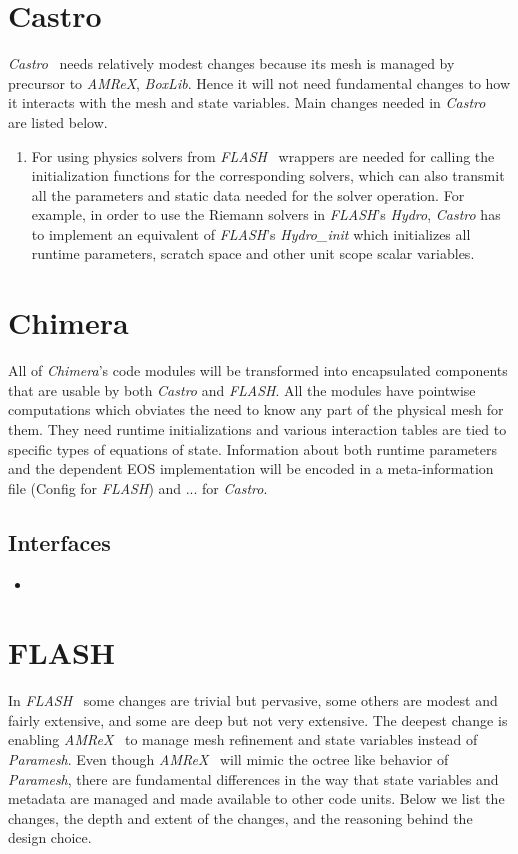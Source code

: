 \documentclass{article}
\newcommand{\flash}{{\it FLASH}}
\newcommand{\amrex}{{\it AMReX}}
\newcommand{\paramesh}{{\it Paramesh}}
\newcommand{\castro}{{\it Castro}\xspace}
\newcommand{\chimera}{{\it Chimera}\xspace}
\begin{document}
\section{Castro}
\label{sec:castro}
\castro~ needs relatively modest changes because its mesh is managed by
precursor to \amrex, {\it BoxLib}. Hence it will not need fundamental
changes to how it interacts with the mesh and state variables. Main
changes needed in \castro~ are listed below.
\begin{enumerate}
\item For using physics solvers from \flash~ wrappers are needed for
calling the initialization functions for the corresponding solvers,
which can also transmit all the parameters and static data needed for
the solver operation. For example, in order to use the Riemann solvers
in \flash's {\it Hydro}, \castro has to implement an equivalent of
\flash's {\it Hydro\_init} which initializes all runtime parameters, 
scratch space and other unit scope scalar variables.
\end{enumerate}

\section{Chimera}
All of \chimera's code modules will be transformed into encapsulated
components that are usable by both \castro and \flash. All the modules
have pointwise computations which obviates the need to know any part of
the physical mesh for them. They need runtime initializations and
various interaction tables are tied to specific types of equations of
state. Information about both runtime parameters and the dependent EOS
implementation will be encoded in a meta-information file (Config for
\flash) and ... for \castro.
\subsection{Interfaces}
\label{sec:chimera-interfaces}
\begin{itemize}
\item
\end{itemize}

\section{FLASH}
\label{sec:flash}
 In \flash~ some changes are trivial but pervasive, some others are
modest and fairly extensive, and some are deep but not very
extensive. The deepest change is enabling \amrex~ to manage mesh
refinement and state variables instead of \paramesh. Even though
\amrex~ will mimic the octree like behavior of \paramesh, there are
fundamental differences in the way that state variables and metadata
are managed and made available to other code units. Below we list the
changes, the depth and extent of the changes, and the reasoning behind
the design choice.
\end{document}

